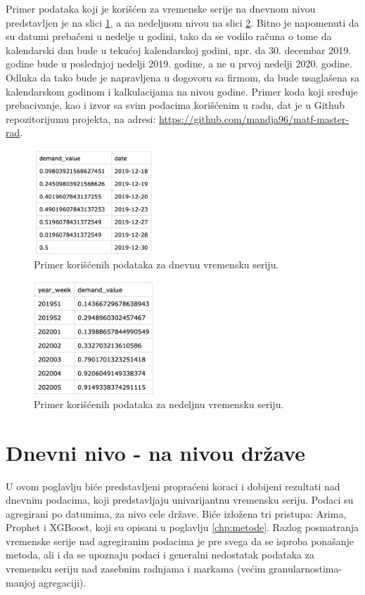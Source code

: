 \documentclass[12pt,oneside]{memoir}
\begin{document}
Primer podataka koji je korišćen za vremenske serije na dnevnom nivou predstavljen je na slici \ref{fig: daily_data_example}, a na nedeljnom nivou na slici \ref{fig: weekly_data_example}. Bitno je napomenuti da su datumi prebačeni u nedelje u godini, tako da se vodilo računa o tome da kalendarski dan bude u tekućoj kalendarskoj godini, npr. da 30. decembar 2019. godine bude u poslednjoj nedelji 2019. godine, a ne u prvoj nedelji 2020. godine. Odluka da tako bude je napravljena u dogovoru sa firmom, da bude usaglašena sa kalendarskom godinom i kalkulacijama na nivou godine. Primer koda koji sređuje prebacivanje, kao i izvor sa svim podacima korišćenim u radu, dat je u Github repozitorijumu projekta, na adresi: \url{https://github.com/mandja96/matf-master-rad}.

\begin{figure}[!ht]
  \centering
  \includegraphics[width=0.4\textwidth]{./grafici/daily_data_example.png}
  \caption{Primer korišćenih podataka za dnevnu vremensku seriju.}
  \label{fig: daily_data_example}
\end{figure}

\begin{figure}[!ht]
  \centering
  \includegraphics[width=0.4\textwidth]{./grafici/weekly_data_example.png}
  \caption{Primer korišćenih podataka za nedeljnu vremensku seriju.}
  \label{fig: weekly_data_example}
\end{figure}

\section{Dnevni nivo - na nivou države} 
U ovom poglavlju biće predstavljeni propraćeni koraci i dobijeni rezultati nad dnevnim podacima, koji predstavljaju univarijantnu vremensku seriju. Podaci su agregirani po datumima, za nivo cele države. Biće izložena tri pristupa: Arima, Prophet i XGBoost, koji su opisani u poglavlju \ref{chp:metode}. Razlog posmatranja vremenske serije nad agregiranim podacima je pre svega da se isproba ponašanje metoda, ali i da se upoznaju podaci i generalni nedostatak podataka za vremensku seriju nad zasebnim radnjama i markama (većim granularnostima-manjoj agregaciji). 
\end{document}
